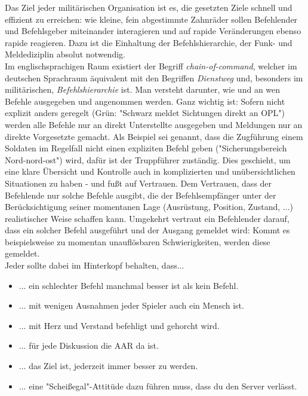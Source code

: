 	Das Ziel jeder militärischen Organisation ist es, die gesetzten Ziele schnell und effizient zu erreichen: wie kleine, fein abgestimmte Zahnräder sollen Befehlender und Befehlsgeber miteinander interagieren und auf rapide Veränderungen ebenso rapide reagieren. Dazu ist die Einhaltung der Befehlshierarchie, der Funk- und Meldediziplin absolut notwendig.\\
	Im englischsprachigen Raum existiert der Begriff \textit{chain-of-command}, welcher im deutschen Sprachraum äquivalent mit den Begriffen \textit{Dienstweg} und, besonders im militärischen, \textit{Befehlshierarchie} ist. Man versteht darunter, wie und an wen Befehle ausgegeben und angenommen werden. Ganz wichtig ist: Sofern nicht explizit anders geregelt (Grün: "Schwarz meldet Sichtungen direkt an \ac{OPL}") werden alle Befehle nur an direkt Unterstellte ausgegeben und Meldungen nur an direkte Vorgesetzte gemacht. Als Beispiel sei genannt, dass die Zugführung einem Soldaten im Regelfall nicht einen expliziten Befehl geben ("Sicherungsbereich Nord-nord-ost") wird, dafür ist der Truppführer zuständig. Dies geschieht, um eine klare Übersicht und Kontrolle auch in komplizierten und unübersichtlichen Situationen zu haben - und fußt auf Vertrauen. Dem Vertrauen, dass der Befehlende nur solche Befehle ausgibt, die der Befehlsempfänger unter der Berücksichtigung seiner momentanen Lage (Ausrüstung, Position, Zustand, ...) realistischer Weise schaffen kann. Umgekehrt vertraut ein Befehlender darauf, dass ein solcher Befehl ausgeführt und der Ausgang gemeldet wird: Kommt es beispielsweise zu momentan unauflösbaren Schwierigkeiten, werden diese gemeldet. \\
	Jeder sollte dabei im Hinterkopf behalten, dass...
		\begin{itemize}
			\item ... ein schlechter Befehl manchmal besser ist als kein Befehl.
			\item ... mit wenigen Ausnahmen jeder Spieler auch ein Mensch ist. 
			\item ... mit Herz und Verstand befehligt und gehorcht wird. 
			\item ... für jede Diskussion die \ac{AAR} da ist.
			\item ... das Ziel ist, jederzeit immer besser zu werden.
			\item ... eine "Scheißegal"-Attitüde dazu führen muss, dass du den Server verlässt.
		\end{itemize}


